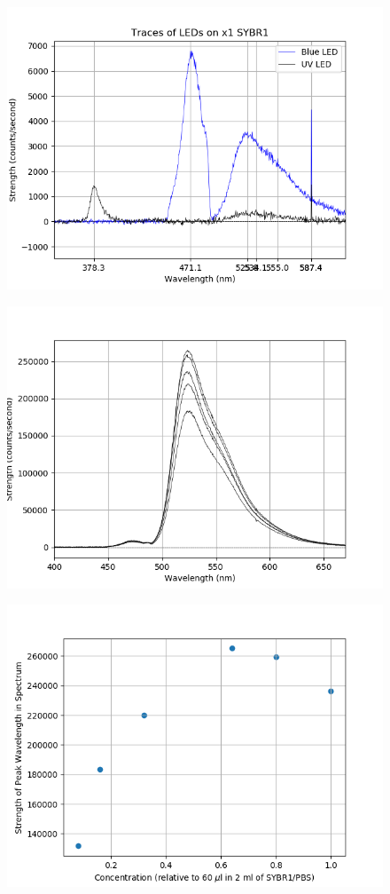 \documentclass[8pt, a4paper]{article}
\begin{document}
\begin{figure}[h!]
\includegraphics{stain.png}
\end{figure}

\begin{figure}[h!]
\includegraphics{conc2.png}
\end{figure}

\begin{figure}[h!]
\includegraphics{dsDNA_conc.png}
\end{figure}
\end{document}
